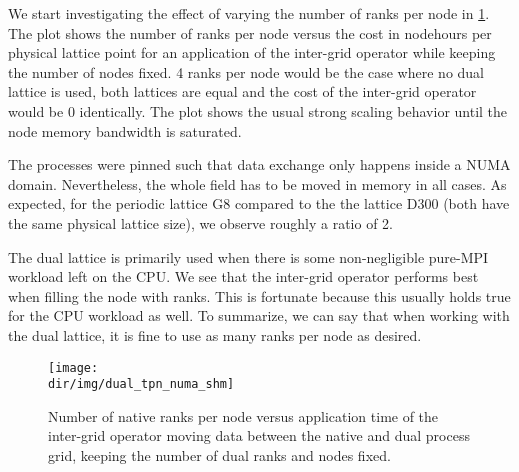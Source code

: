 We start investigating the effect of varying the number of ranks per node in \cref{fig:dual:tpn}.
The plot shows the number of ranks per node versus the cost in nodehours per physical lattice point for an application of the inter-grid operator while keeping the number of nodes fixed.
\num{4} ranks per node would be the case where no dual lattice is used, \ie both lattices are equal and the cost of the inter-grid operator would be \num{0} identically.
The plot shows the usual strong scaling behavior until the node memory bandwidth is saturated.

The processes were pinned such that data exchange only happens inside a NUMA domain.
Nevertheless, the whole field has to be moved in memory in all cases.
As expected, for the periodic lattice G8 compared to the the \Cstar lattice D300 (both have the same physical lattice size), we observe roughly a ratio of \num{2}.

The dual lattice is primarily used when there is some non-negligible pure-MPI workload left on the CPU.
We see that the inter-grid operator performs best when filling the node with ranks.
This is fortunate because this usually holds true for the CPU workload as well.
To summarize, we can say that when working with the dual lattice, it is fine to use as many ranks per node as desired.
\begin{figure}
    \centering
    \texttt{[image: \\dir/img/dual\_tpn\_numa\_shm]}
    \caption{Number of native ranks per node versus application time of the inter-grid operator moving data between the native and dual process grid, keeping the number of dual ranks and nodes fixed. }
    \label{fig:dual:tpn}
\end{figure}

